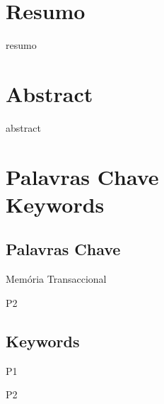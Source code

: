 \cleardoublepage



\chapter*{Resumo}
\thispagestyle{empty}

resumo

\newpage
\thispagestyle{empty}

\chapter*{Abstract}
\thispagestyle{empty}

abstract


\newpage
\thispagestyle{empty}


\chapter*{Palavras Chave \\ Keywords}
\thispagestyle{empty}

\section*{Palavras Chave}
{\large

\noindent Memória Transaccional

\noindent P2

}

\section*{Keywords}

{\large

\noindent P1

\noindent P2

}

\newpage
\thispagestyle{empty}

\cleardoublepage



\tableofcontents
\newpage

\listoffigures
\newpage



